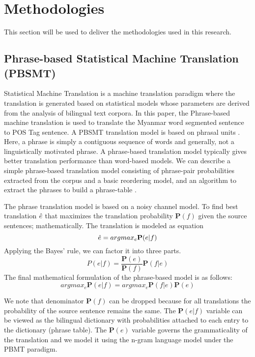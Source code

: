 \documentclass[conference]{IEEEtran}
\begin{document}
\section{Methodologies}\label{sec:Methodologies}
This section will be used to deliver the methodologies used in this research.

\subsection{Phrase-based Statistical Machine Translation (PBSMT)}

Statistical Machine Translation is a machine translation paradigm where the translation is generated based on statistical models whose parameters are derived from the analysis of bilingual text corpora. In this paper, the Phrase-based machine translation is used to translate the Myanmar word segmented sentence to POS Tag sentence.
A PBSMT translation model is based on phrasal units \cite{b4}.
Here, a phrase is simply a contiguous sequence of words and generally, not a linguistically motivated phrase. A phrase-based translation model typically gives better translation performance than word-based models. We can describe a simple phrase-based translation model consisting of phrase-pair probabilities extracted from the corpus and a basic reordering model, and an algorithm to extract the phrases to build a phrase-table \cite{b5}.

The phrase translation model is based on a noisy channel model. To find best translation $ \Hat{e} $
that maximizes the translation probability $ \mathbf{P}(f) $ given the source sentences; mathematically. The translation  is modeled as equation
\begin{equation} \label{eq:1}
\Hat{e}=argmax_e \mathbf {P}(e|f)
\end{equation}
Applying the Bayes’ rule, we can factor it into three parts.
\begin{equation} \label{eq:2}
P(e|f)=\frac{\mathbf{P}(e)}{\mathbf{P}(f)}\mathbf{P}(f|e)
\end{equation}
The final mathematical formulation of the phrase-based model is  as follows:
\begin{equation} \label{eq:3}
argmax_e \mathbf {P}(e|f)=argmax_e \mathbf {P}(f|e) \mathbf{P}(e)
\end{equation}

We note that denominator $\mathbf{P}(f)$ can be dropped because for all translations the probability of the source sentence remains the same. The $\mathbf {P}(e|f)$ variable can be viewed as the bilingual dictionary with probabilities attached to each entry to the dictionary (phrase table). The $\mathbf{P}(e)$ variable governs the grammaticality of the translation and we model it using the n-gram language model under the PBMT paradigm.
\end{document}
